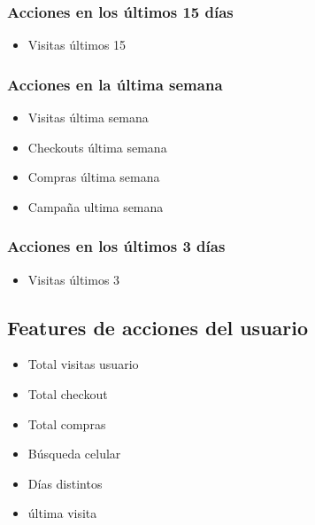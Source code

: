 \documentclass[a4paper ,12pt]{article}
\begin{document}
	
		

		\subsubsection{Acciones en los últimos 15 días}		
		
		\begin{itemize}
			\item 	Visitas últimos 15
		\end{itemize}
		


		\subsubsection{Acciones en la última semana}
			
			\begin{itemize}
				\item  Visitas última semana
				\item  Checkouts última semana
				\item  Compras última semana 
				\item Campaña ultima semana
			\end{itemize}
			

		\subsubsection{Acciones en los últimos 3 días}
		
		
		
			\begin{itemize}
				\item Visitas últimos 3
			\end{itemize}





\subsection{Features de acciones del usuario}

	\begin{itemize}
		\item Total visitas usuario
		
		\item Total checkout
		
		\item Total compras
		
		\item Búsqueda celular 
		
		\item Días distintos 
		
		\item última visita 
		
	\end{itemize}
	
\end{document}
